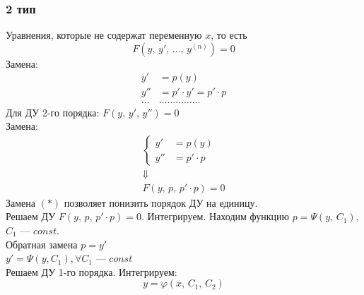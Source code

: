 \subsubsection*{2 тип}
Уравнения, которые не содержат переменную $x$, то есть
\[
    \boxed{F\left(y,\, y',\, \ldots,\, y^{(n)}\right) = 0}
\]
Замена: \vspace{-\topsep}
\begin{align*}
    y' &= p(y) \\
    y'' &= p'\cdot y' = p' \cdot p \\
    \ldots&\ldots\ldots\ldots\ldots\ldots
\end{align*}
Для ДУ 2-го порядка: $\boxed{F(y,\, y',\, y'') = 0}$ \\[1ex]
Замена:
\begin{gather*}
    \left\{ \begin{aligned}
        y' &= p(y) \\
        y'' &= p'\cdot p
    \end{aligned} \right. \tag{$*$} \\
    \Downarrow \\
    \boxed{F(y,\, p,\, p'\cdot p) = 0}
\end{gather*} 
Замена $(*)$ позволяет понизить порядок ДУ на единицу. \\[1ex]
 Решаем ДУ $F(y,\, p,\, p'\cdot p) = 0$. Интегрируем. Находим функцию $p = \Psi(y,\, C_1)$,\break$C_1$ --- $const$. \\[1ex]
 Обратная замена $p = y'$ \\[1ex]
 $y' = \Psi (y, C_1), \forall C_1$ --- $const$ \\[1ex]
Решаем ДУ 1-го порядка. Интегрируем:
\[
    y = \varphi (x,\, C_1,\, C_2)
\]

